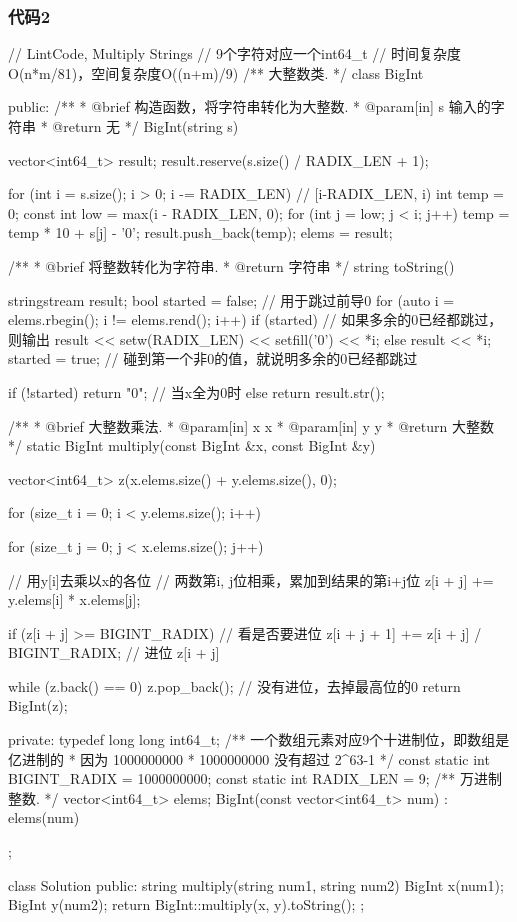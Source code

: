\subsubsection{代码2}
\begin{Code}
// LintCode, Multiply Strings
// 9个字符对应一个int64_t
// 时间复杂度O(n*m/81)，空间复杂度O((n+m)/9)
/** 大整数类. */
class BigInt {
public:
    /**
     * @brief 构造函数，将字符串转化为大整数.
     * @param[in] s 输入的字符串
     * @return 无
     */
    BigInt(string s) {
        vector<int64_t> result;
        result.reserve(s.size() / RADIX_LEN + 1);

        for (int i = s.size(); i > 0; i -= RADIX_LEN) {  // [i-RADIX_LEN, i)
            int temp = 0;
            const int low = max(i - RADIX_LEN, 0);
            for (int j = low; j < i; j++) {
                temp = temp * 10 + s[j] - '0';
            }
            result.push_back(temp);
        }
        elems = result;
    }
    /**
     * @brief 将整数转化为字符串.
     * @return 字符串
     */
    string toString() {
        stringstream result;
        bool started = false; // 用于跳过前导0
        for (auto i = elems.rbegin(); i != elems.rend(); i++) {
            if (started) { // 如果多余的0已经都跳过，则输出
                result << setw(RADIX_LEN) << setfill('0') << *i;
            } else {
                result << *i;
                started = true; // 碰到第一个非0的值，就说明多余的0已经都跳过
            }
        }

        if (!started) return "0"; // 当x全为0时
        else return result.str();
    }

    /**
     * @brief 大整数乘法.
     * @param[in] x x
     * @param[in] y y
     * @return 大整数
     */
    static BigInt multiply(const BigInt &x, const BigInt &y) {
        vector<int64_t> z(x.elems.size() + y.elems.size(), 0);

        for (size_t i = 0; i < y.elems.size(); i++) {
            for (size_t j = 0; j < x.elems.size(); j++) { // 用y[i]去乘以x的各位
                //  两数第i, j位相乘，累加到结果的第i+j位
                z[i + j] += y.elems[i] * x.elems[j];

                if (z[i + j] >= BIGINT_RADIX) { //  看是否要进位
                    z[i + j + 1] += z[i + j] / BIGINT_RADIX; //  进位
                    z[i + j] %
                }
            }
        }
        while (z.back() == 0) z.pop_back();  // 没有进位，去掉最高位的0
        return BigInt(z);
    }

private:
    typedef long long int64_t;
    /** 一个数组元素对应9个十进制位，即数组是亿进制的
     * 因为 1000000000 * 1000000000 没有超过 2^63-1
     */
    const static int BIGINT_RADIX = 1000000000;
    const static int RADIX_LEN = 9;
    /** 万进制整数. */
    vector<int64_t> elems;
    BigInt(const vector<int64_t> num) : elems(num) {}
};


class Solution {
public:
    string multiply(string num1, string num2) {
        BigInt x(num1);
        BigInt y(num2);
        return BigInt::multiply(x, y).toString();
    }
};
\end{Code}


